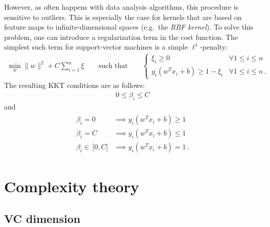     However, as often happens with data analysis algorithms, this procedure is sensitive to outliers. This is especially the case for kernels that are based on feature maps to infinite-dimensional spaces (e.g.~the \textit{RBF kernel}). To solve this problem, one can introduce a regularization term in the cost function. The simplest such term for support-vector machines is a simple $\ell^1$-penalty:
    \begin{gather}
        \min_w\|w\|^2 + C\sum_{i=1}^n\xi \qquad\text{such that}\qquad
        \begin{cases}
            \xi_i\geq0&\forall 1\leq i\leq n\\
            y_i(w^Tx_i+b)\geq1-\xi_i&\forall 1\leq i\leq n\,.
        \end{cases}
    \end{gather}
    The resulting KKT conditions are as follows:
    \begin{gather}
        0\leq\beta_i\leq C
    \end{gather}
    and
    \begin{gather}
        \begin{aligned}
            \beta_i = 0&\implies y_i(w^Tx_i+b)\geq1\\
            \beta_i = C&\implies y_i(w^Tx_i+b)\leq1\\
            \beta_i\in\,]0,C[&\implies y_i(w^Tx_i+b)=1\,.
        \end{aligned}
    \end{gather}


\section{Complexity theory}
\subsection{VC dimension}

